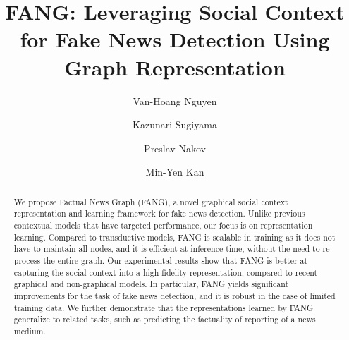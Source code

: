 \documentclass[sigconf]{acmart}
\theoremstyle{definition}
\theoremstyle{hypothesis}
\begin{document}
\fancyhead{}

\title{FANG: Leveraging Social Context for Fake News Detection Using Graph Representation}


\author{Van-Hoang Nguyen}

\author{Kazunari Sugiyama}

\author{Preslav Nakov}

\author{Min-Yen Kan}

\renewcommand{\shortauthors}{Nguyen, Sugiyama, Nakov, and Kan}

\begin{abstract}
We propose Factual News Graph (FANG), a novel graphical social context representation and learning framework for fake news detection. Unlike previous contextual models that have targeted performance, our focus is on representation learning. Compared to transductive models, FANG is scalable in training as it does not have to maintain all nodes, and it is efficient at inference time, without the need to re-process the entire graph. Our experimental results show that FANG is better at capturing the social context into a high fidelity representation, compared to recent graphical and non-graphical models. In particular, FANG yields significant improvements for the task of fake news detection, and it is robust in the case of limited training data. We further demonstrate that the representations learned by FANG generalize to related tasks, such as predicting the factuality of reporting of a news medium. 
\end{abstract}
\end{document}
